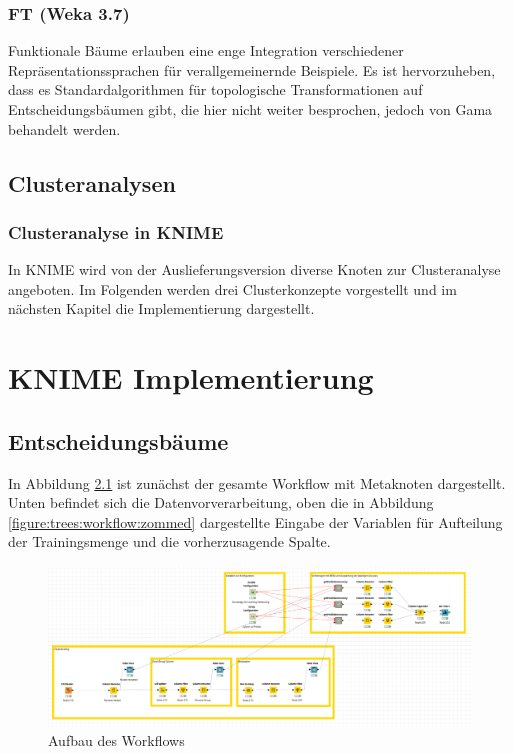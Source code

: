 \documentclass[12pt,					%
							 oneside,			%
							 a4paper,			%
							 halfparskip,		%
							 liststotoc,			%
							 bibtotoc,			%
							 fleqn,				%
							 pointlessnumbers]	%
							 {scrreprt}
\begin{document}
		\subsection{FT (Weka 3.7)}
			Funktionale Bäume erlauben eine enge Integration verschiedener Repräsentationssprachen für verallgemeinernde Beispiele. Es ist hervorzuheben, dass es Standardalgorithmen für topologische Transformationen auf Entscheidungsbäumen gibt, die hier nicht weiter besprochen, jedoch von Gama behandelt werden.\cite{Gama2004}
			

	\section{Clusteranalysen}
		\subsection{Clusteranalyse in KNIME}
		In KNIME wird von der Auslieferungsversion diverse Knoten zur Clusteranalyse angeboten. Im Folgenden werden drei Clusterkonzepte vorgestellt und im nächsten Kapitel die Implementierung dargestellt.
\chapter{KNIME Implementierung}

	\section{Entscheidungsbäume}
		In Abbildung \ref{figure:trees:workflow} ist zunächst der gesamte Workflow mit Metaknoten dargestellt. Unten befindet sich die Datenvorverarbeitung, oben die in Abbildung \ref{figure:trees:workflow:zommed} dargestellte Eingabe der Variablen für Aufteilung der Trainingsmenge und die vorherzusagende Spalte.
				
		\begin{figure}[h]
			\begin{center}
				\includegraphics[scale=0.3]{pictures/trees-workflow-gesamt.png}
				\caption{Aufbau des Workflows}									
				\label{figure:trees:workflow}
			\end{center}
		\end{figure}
		
\end{document}
